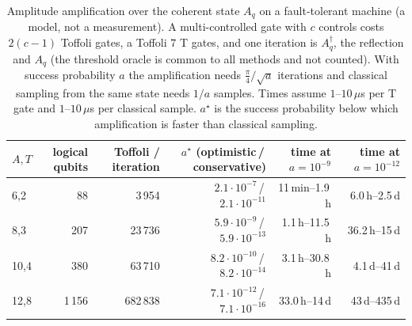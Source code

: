 \begin{table}[t]
\centering\footnotesize\setlength{\tabcolsep}{3pt}
\caption{ Amplitude amplification over the coherent state $A_q$ on a fault-tolerant machine (a model, not a measurement). A multi-controlled gate with $c$ controls costs $2(c-1)$ Toffoli gates, a Toffoli $7$ T gates, and one iteration is $A_q^\dagger$, the reflection and $A_q$ (the threshold oracle is common to all methods and not counted). With success probability $a$ the amplification needs $\frac\pi4/\sqrt a$ iterations and classical sampling from the same state needs $1/a$ samples. Times assume $1$--$10\,\mu$s per T gate and $1$--$10\,\mu$s per classical sample. $a^\star$ is the success probability below which amplification is faster than classical sampling.}\label{tab:large_grover_ft}
\begin{tabular}{lrrrrr}
\toprule
$A,T$ & logical qubits & Toffoli / iteration & $a^\star$ (optimistic\,/\,conservative) & time at $a=10^{-9}$ & time at $a=10^{-12}$\\
\midrule
6,2 & 88 & 3\,954 & $2.1\!\cdot\!10^{-7}$\,/\,$2.1\!\cdot\!10^{-11}$ & 11\,min--1.9\,h & 6.0\,h--2.5\,d\\
8,3 & 207 & 23\,736 & $5.9\!\cdot\!10^{-9}$\,/\,$5.9\!\cdot\!10^{-13}$ & 1.1\,h--11.5\,h & 36.2\,h--15\,d\\
10,4 & 380 & 63\,710 & $8.2\!\cdot\!10^{-10}$\,/\,$8.2\!\cdot\!10^{-14}$ & 3.1\,h--30.8\,h & 4.1\,d--41\,d\\
12,8 & 1\,156 & 682\,838 & $7.1\!\cdot\!10^{-12}$\,/\,$7.1\!\cdot\!10^{-16}$ & 33.0\,h--14\,d & 43\,d--435\,d\\
\bottomrule
\end{tabular}
\end{table}
